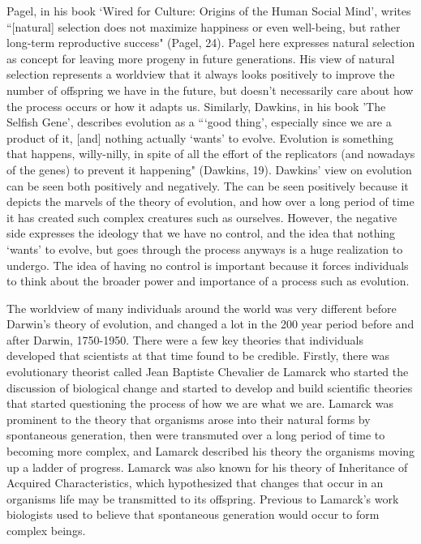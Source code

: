 \documentclass[11pt, oneside]{article}
\begin{document}
\par Pagel, in his book `Wired for Culture: Origins of the Human Social Mind', writes ``[natural] selection does not maximize happiness or even well-being, but rather long-term reproductive success" (Pagel, 24). Pagel here expresses natural selection as concept for leaving more progeny in future generations. His view of natural selection represents a worldview that it always looks positively to improve the number of offspring we have in the future, but doesn't necessarily care about how the process occurs or how it adapts us. Similarly, Dawkins, in his book 'The Selfish Gene', describes evolution as a ```good thing', especially since we are a product of it, [and] nothing actually `wants' to evolve. Evolution is something that happens, willy-nilly, in spite of all the effort of the replicators (and nowadays of the genes) to prevent it happening" (Dawkins, 19). Dawkins' view on evolution can be seen both positively and negatively. The can be seen positively because it depicts the marvels of the theory of evolution, and how over a long period of time it has created such complex creatures such as ourselves. However, the negative side expresses the ideology that we have no control, and the idea that nothing `wants' to evolve, but goes through the process anyways is a huge realization to undergo. The idea of having no control is important because it forces individuals to think about the broader power and importance of a process such as evolution. 



\par The worldview of many individuals around the world was very different before Darwin's theory of evolution, and changed a lot in the 200 year period before and after Darwin, 1750-1950. There were a few key theories that individuals developed that scientists at that time found to be credible. Firstly, there was evolutionary theorist called Jean Baptiste Chevalier de Lamarck who started the discussion of biological change and started to develop and build scientific theories that started questioning the process of how we are what we are. Lamarck was prominent to the theory that organisms arose into their natural forms by spontaneous generation, then were transmuted over a long period of time to becoming more complex, and Lamarck described his theory the organisms moving up a ladder of progress. Lamarck was also known for his theory of Inheritance of Acquired Characteristics, which hypothesized that changes that occur in an organisms life may be transmitted to its offspring. Previous to Lamarck's work biologists used to believe that spontaneous generation would occur to form complex beings. 
\end{document}
